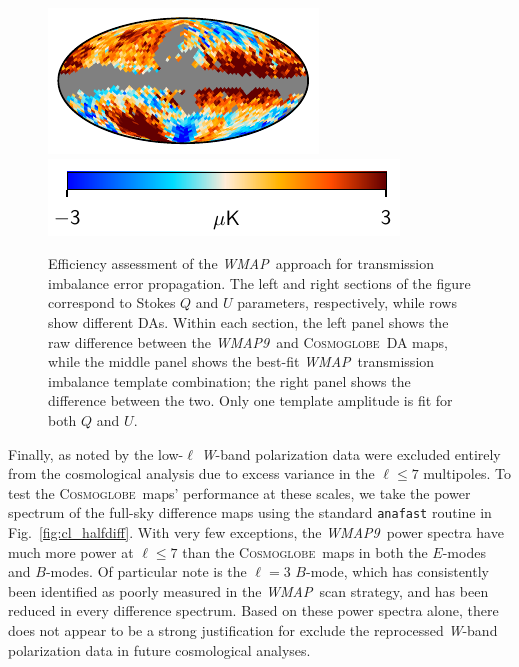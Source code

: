 \documentclass[twocolumn]{../../common/aa}
\def\WMAP{\emph{WMAP}}
\def\WMAPnine{\emph{WMAP9}}
\newcommand{\cosmoglobe}{\textsc{Cosmoglobe}}
\newcommand{\W}[0]{\textit W}
\begin{document}
\begin{figure}[t]
        \includegraphics[width=0.16\linewidth]{figures/res_loss_W4_U.pdf}\\
        \includegraphics[width=0.30\linewidth]{figures/colourbar_3uK.pdf}\\         
	\caption{Efficiency assessment of the \WMAP\ approach for transmission imbalance error propagation. The left and right sections of the figure correspond to Stokes $Q$ and $U$ parameters, respectively, while rows show different DAs. Within each section, the left panel shows the raw difference between the \WMAPnine\ and \cosmoglobe\ DA maps, while the middle panel shows the best-fit \WMAP\ transmission imbalance template combination; the right panel shows the difference between the two. Only one template amplitude is fit for both $Q$ and $U$.}
	\label{fig:imbal}
\end{figure}



Finally, as noted by \citet{jarosik2010} the low-$\ell$ \W-band polarization data were excluded entirely from the cosmological analysis due to excess variance in the $\ell\leq7$ multipoles. To test the \cosmoglobe\ maps' performance at these scales, we take the power spectrum of the full-sky difference maps using the standard \texttt{anafast} routine in Fig.~\ref{fig:cl_halfdiff}. With very few exceptions, the \WMAPnine\ power spectra have much more power at $\ell\leq7$ than the \cosmoglobe\ maps in both the $E$-modes and $B$-modes. Of particular note is the $\ell=3$ $B$-mode, which has consistently been identified as poorly measured in the \WMAP\ scan strategy, and has been reduced in every difference spectrum. Based on these power spectra alone, there does not appear to be a strong justification for exclude the reprocessed \W-band polarization data in future cosmological analyses.
\end{document}
